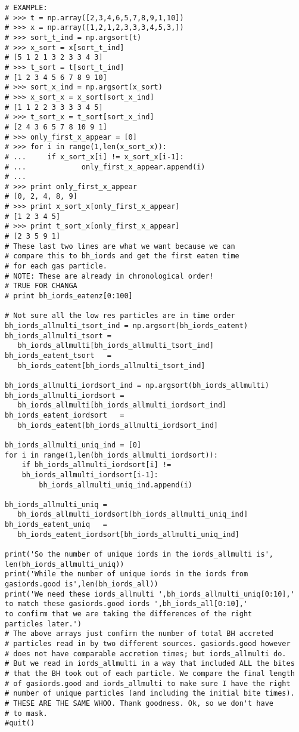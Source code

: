 \documentclass[12pt,headA,chapB]{fiskthesis}
\begin{document}
\begin{verbatim}
# EXAMPLE:
# >>> t = np.array([2,3,4,6,5,7,8,9,1,10])
# >>> x = np.array([1,2,1,2,3,3,3,4,5,3,])
# >>> sort_t_ind = np.argsort(t)
# >>> x_sort = x[sort_t_ind]
# [5 1 2 1 3 2 3 3 4 3]
# >>> t_sort = t[sort_t_ind]
# [1 2 3 4 5 6 7 8 9 10]
# >>> sort_x_ind = np.argsort(x_sort)
# >>> x_sort_x = x_sort[sort_x_ind]
# [1 1 2 2 3 3 3 3 4 5]
# >>> t_sort_x = t_sort[sort_x_ind]
# [2 4 3 6 5 7 8 10 9 1]
# >>> only_first_x_appear = [0]
# >>> for i in range(1,len(x_sort_x)):
# ...     if x_sort_x[i] != x_sort_x[i-1]:
# ...             only_first_x_appear.append(i)
# ... 
# >>> print only_first_x_appear
# [0, 2, 4, 8, 9]
# >>> print x_sort_x[only_first_x_appear]
# [1 2 3 4 5]
# >>> print t_sort_x[only_first_x_appear]
# [2 3 5 9 1]
# These last two lines are what we want because we can 
# compare this to bh_iords and get the first eaten time 
# for each gas particle.
# NOTE: These are already in chronological order! 
# TRUE FOR CHANGA
# print bh_iords_eatenz[0:100]

# Not sure all the low res particles are in time order
bh_iords_allmulti_tsort_ind = np.argsort(bh_iords_eatent)
bh_iords_allmulti_tsort = 
   bh_iords_allmulti[bh_iords_allmulti_tsort_ind]
bh_iords_eatent_tsort   = 
   bh_iords_eatent[bh_iords_allmulti_tsort_ind]

bh_iords_allmulti_iordsort_ind = np.argsort(bh_iords_allmulti)
bh_iords_allmulti_iordsort = 
   bh_iords_allmulti[bh_iords_allmulti_iordsort_ind]
bh_iords_eatent_iordsort   = 
   bh_iords_eatent[bh_iords_allmulti_iordsort_ind]

bh_iords_allmulti_uniq_ind = [0]
for i in range(1,len(bh_iords_allmulti_iordsort)):
    if bh_iords_allmulti_iordsort[i] != 
    bh_iords_allmulti_iordsort[i-1]:
        bh_iords_allmulti_uniq_ind.append(i)

bh_iords_allmulti_uniq = 
   bh_iords_allmulti_iordsort[bh_iords_allmulti_uniq_ind]
bh_iords_eatent_uniq   = 
   bh_iords_eatent_iordsort[bh_iords_allmulti_uniq_ind]

print('So the number of unique iords in the iords_allmulti is',
len(bh_iords_allmulti_uniq))
print('While the number of unique iords in the iords from 
gasiords.good is',len(bh_iords_all))
print('We need these iords_allmulti ',bh_iords_allmulti_uniq[0:10],' 
to match these gasiords.good iords ',bh_iords_all[0:10],' 
to confirm that we are taking the differences of the right 
particles later.')
# The above arrays just confirm the number of total BH accreted
# particles read in by two different sources. gasiords.good however 
# does not have comparable accretion times; but iords_allmulti do. 
# But we read in iords_allmulti in a way that included ALL the bites 
# that the BH took out of each particle. We compare the final length 
# of gasiords.good and iords_allmulti to make sure I have the right 
# number of unique particles (and including the initial bite times).
# THESE ARE THE SAME WHOO. Thank goodness. Ok, so we don't have 
# to mask.
#quit()


\end{verbatim}
\end{document}
